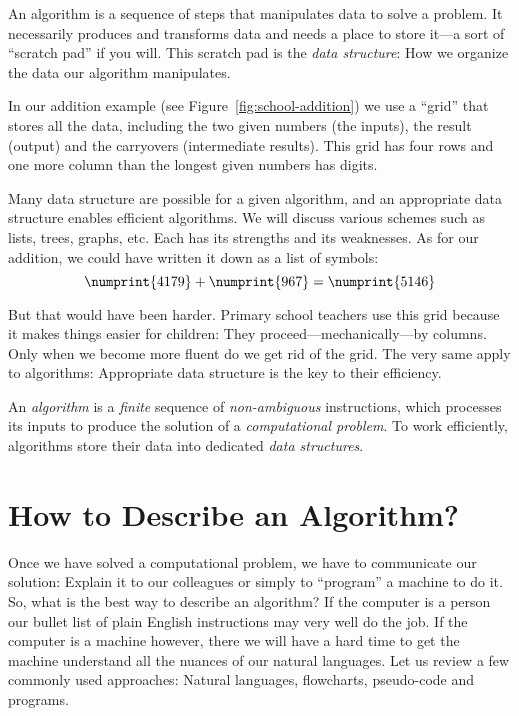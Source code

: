 \documentclass{aldast}
\begin{document}
An algorithm is a sequence of steps that manipulates data to solve a
problem. It necessarily produces and transforms data and needs a place
to store it---a sort of ``scratch pad'' if you will. This scratch pad
is the \emph{data structure}: How we organize the data our algorithm
manipulates.

In our addition example (see Figure~\ref{fig:school-addition}) we use
a ``grid'' that stores all the data, including the two
given numbers (the inputs), the result (output) and the carryovers
(intermediate results). This grid has four rows and one more column than
the longest given numbers has digits.

Many data structure are possible for a given algorithm, and an
appropriate data structure enables efficient algorithms. We will
discuss various schemes such as lists, trees, graphs, etc. Each has
its strengths and its weaknesses. As for our addition, we could have
written it down as a list of symbols:
\begin{equation}
\numprint{4179} + \numprint{967} = \numprint{5146}
\end{equation}

But that would have been harder. Primary school teachers use this grid
because it makes things easier for children: They
proceed---mechanically---by columns. Only when we become more fluent
do we get rid of the grid. The very same apply to algorithms:
Appropriate data structure is the key to their efficiency.

\begin{takeaway}
  An \emph{algorithm} is a \emph{finite} sequence of
  \emph{non-ambiguous} instructions, which processes its inputs to
  produce the solution of a \emph{computational problem}. To work
  efficiently, algorithms store their data into dedicated \emph{data
    structures}.
\end{takeaway}

\section{How to Describe an Algorithm?}

Once we have solved a computational problem, we have to communicate
our solution: Explain it to our colleagues or simply to ``program'' a
machine to do it. So, what is the best way to describe an
algorithm? If the computer is a person our bullet list of plain
English instructions may very well do the job. If the computer is a
machine however, there we will have a hard time to get the machine
understand all the nuances of our natural languages. Let us review a
few commonly used approaches: Natural languages, flowcharts,
pseudo-code and programs.
\end{document}
